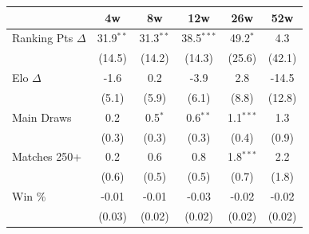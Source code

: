 \begin{tabular}{l*{5}{c}}
\toprule
 & 4w & 8w & 12w & 26w & 52w \\
\midrule
Ranking Pts $\Delta$ & 31.9$^{**}$ & 31.3$^{**}$ & 38.5$^{***}$ & 49.2$^{*}$ & 4.3 \\
 & (14.5) & (14.2) & (14.3) & (25.6) & (42.1) \\[0.3em]
Elo $\Delta$ & -1.6 & 0.2 & -3.9 & 2.8 & -14.5 \\
 & (5.1) & (5.9) & (6.1) & (8.8) & (12.8) \\[0.3em]
Main Draws & 0.2 & 0.5$^{*}$ & 0.6$^{**}$ & 1.1$^{***}$ & 1.3 \\
 & (0.3) & (0.3) & (0.3) & (0.4) & (0.9) \\[0.3em]
Matches 250+ & 0.2 & 0.6 & 0.8 & 1.8$^{***}$ & 2.2 \\
 & (0.6) & (0.5) & (0.5) & (0.7) & (1.8) \\[0.3em]
Win \% & -0.01 & -0.01 & -0.03 & -0.02 & -0.02 \\
 & (0.03) & (0.02) & (0.02) & (0.02) & (0.02) \\[0.3em]
\bottomrule
\end{tabular}
